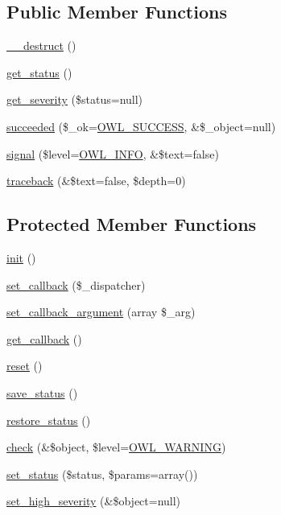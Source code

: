 \subsection*{Public Member Functions}
\begin{DoxyCompactItemize}
\item 
\hyperlink{class__OWL_a44fd2222476a3109286cc82d92b6bbcc}{\_\-\_\-destruct} ()
\item 
\hyperlink{class__OWL_a99ec771fa2c5c279f80152cc09e489a8}{get\_\-status} ()
\item 
\hyperlink{class__OWL_adf9509ef96858be7bdd9414c5ef129aa}{get\_\-severity} (\$status=null)
\item 
\hyperlink{class__OWL_a53ab4d3bbb2c6a56966c339ca4b4c805}{succeeded} (\$\_\-ok=\hyperlink{owl_8severitycodes_8php_a96223f06ba27bf5cbefa6e9d702897c2}{OWL\_\-SUCCESS}, \&\$\_\-object=null)
\item 
\hyperlink{class__OWL_a51ba4a16409acf2a2f61f286939091a5}{signal} (\$level=\hyperlink{owl_8severitycodes_8php_a139328861128689f2f4def6a399d9057}{OWL\_\-INFO}, \&\$text=false)
\item 
\hyperlink{class__OWL_aa29547995d6741b7d2b90c1d4ea99a13}{traceback} (\&\$text=false, \$depth=0)
\end{DoxyCompactItemize}
\subsection*{Protected Member Functions}
\begin{DoxyCompactItemize}
\item 
\hyperlink{class__OWL_ae0ef3ded56e8a6b34b6461e5a721cd3e}{init} ()
\item 
\hyperlink{class__OWL_a28d9025eaf37b49d63cb334ed28c33f0}{set\_\-callback} (\$\_\-dispatcher)
\item 
\hyperlink{class__OWL_a1e26611ce858b237f5a98a91ea3c3a1b}{set\_\-callback\_\-argument} (array \$\_\-arg)
\item 
\hyperlink{class__OWL_abded13b1c97ea6e0cfe3c68cb6bcf7a5}{get\_\-callback} ()
\item 
\hyperlink{class__OWL_a2f2a042bcf31965194c03033df0edc9b}{reset} ()
\item 
\hyperlink{class__OWL_a9e49b9c76fbc021b244c6915ea536d71}{save\_\-status} ()
\item 
\hyperlink{class__OWL_a465eeaf40edd9f9c848841700c32ce55}{restore\_\-status} ()
\item 
\hyperlink{class__OWL_ae2e3c56e5f3c4ce4156c6b1bb1c50f63}{check} (\&\$object, \$level=\hyperlink{owl_8severitycodes_8php_ace886152e2e86cd2e91cb833fd495adb}{OWL\_\-WARNING})
\item 
\hyperlink{class__OWL_aea912d0ede9b3c2a69b79072d94d4787}{set\_\-status} (\$status, \$params=array())
\item 
\hyperlink{class__OWL_a576829692a3b66e3d518853bf43abae3}{set\_\-high\_\-severity} (\&\$object=null)
\end{DoxyCompactItemize}
